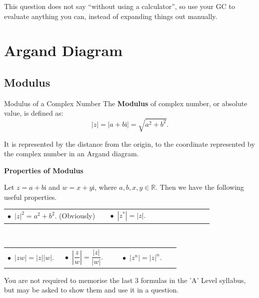 {\color{gray}This question does not say ``without using a calculator'', so use your GC to evaluate anything you can, instead of expanding things out manually.}




\clearpage
\section{Argand Diagram}
\subsection{Modulus}
\begin{definition}{Modulus of a Complex Number}
The \textbf{Modulus} of complex number, or absolute value, is defined as:
\[|z|=|a+b\mathrm{i}|=\sqrt{a^{2}+b^{2}}.\]
\end{definition}
It is represented by the distance from the origin, to the coordinate represented by the complex number in an Argand diagram.

\noindent\textbf{Properties of Modulus}\par
Let $z=a+b\mathrm{i}$ and $w=x+y\mathrm{i}$, where $a,b,x,y\in\mathbb{R}$. Then we have the following useful properties.
\begin{center}\begin{tabular}{@{}p{0.46\linewidth}p{0.46\linewidth}@{}}$\bullet$\ $|z|^{2}=a^{2}+b^{2}$. (Obviously)&$\bullet$\ $|z^{*}|=|z|$.\end{tabular}\\[10pt]
\begin{tabular}{@{}p{0.31\linewidth}p{0.31\linewidth}p{0.31\linewidth}@{}}{\color{gray}$\bullet$\ $|zw|=|z||w|$.}&{\color{gray}$\bullet$\ $\left|\dfrac{z}{w}\right|=\dfrac{|z|}{|w|}$.}&{\color{gray}$\bullet$\ $|z^{n}|=|z|^{n}$.}\end{tabular}\end{center}









{\color{gray}You are not required to memorise the last 3 formulas in the 'A' Level syllabus, but may be asked to show them and use it in a question.}

